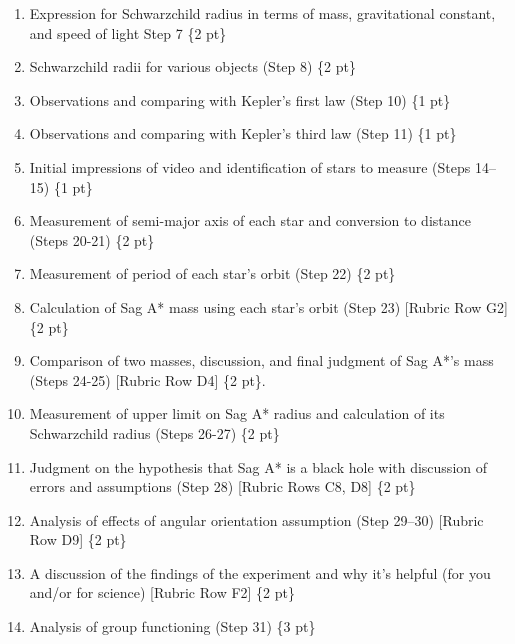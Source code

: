 \begin{enumerate}
	\item Expression for Schwarzchild radius in terms of mass, gravitational constant, and speed of light {Step 7} \{2 pt\}
	
	\item Schwarzchild radii for various objects (Step 8) \{2 pt\}
	
	\item Observations and comparing with Kepler's first law (Step 10) \{1 pt\}
	
	\item Observations and comparing with Kepler's third law (Step 11) \{1 pt\}
	
	\item Initial impressions of video and identification of stars to measure (Steps 14--15) \{1 pt\}
	
	\item Measurement of semi-major axis of each star and conversion to distance (Steps 20-21) \{2 pt\}
	
	\item Measurement of period of each star's orbit (Step 22) \{2 pt\}
	
	\item Calculation of Sag A* mass using each star's orbit (Step 23) [Rubric Row G2] \{2 pt\}
	
	\item Comparison of two masses, discussion, and final judgment of Sag A*'s mass (Steps 24-25) [Rubric Row D4] \{2 pt\}.
	
	\item Measurement of upper limit on Sag A* radius and calculation of its Schwarzchild radius (Steps 26-27) \{2 pt\}
	
	\item Judgment on the hypothesis that Sag A* is a black hole with discussion of errors and assumptions (Step 28) [Rubric Rows C8, D8] \{2 pt\}
	
	\item Analysis of effects of angular orientation assumption (Step 29--30) [Rubric Row D9] \{2 pt\}
	
	\item A discussion of the findings of the experiment and why it's helpful (for you and/or for science) [Rubric Row F2] \{2 pt\}
	
	\item Analysis of group functioning (Step 31) \{3 pt\}
\end{enumerate}


